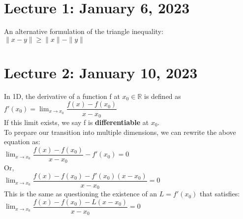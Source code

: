 \documentclass[12pt]{article}
\begin{document}
\section{Lecture 1: January 6, 2023}
\begin{tcolorbox}
An alternative formulation of the triangle inequality:\\
$\|x - y\| \geq \|x\| - \|y \|$
\end{tcolorbox}
\section{Lecture 2: January 10, 2023}
In 1D, the derivative of a function f at $x_0 \in \mathbb{R}$ is defined as \\
$f'(x_0) = \lim_{x\rightarrow x_0} \dfrac{f(x) - f(x_0)}{x - x_0}$\\
If this limit exists, we say f is \textbf{differentiable} at $x_0$.\\
To prepare our transition into multiple dimensions, we can rewrite the above equation as:\\
$\lim_{x \rightarrow x_0} \dfrac{f(x) - f(x_0)}{x - x_0} - f'(x_0) = 0$\\
Or,\\
$\lim_{x \rightarrow x_0} \dfrac{f(x) - f(x_0) - f'(x_0)(x - x_0)}{x - x_0} = 0$\\
This is the same as questioning the existence of an $L = f'(x_0)$ that satisfies:\\
$\lim_{x \rightarrow x_0} \dfrac{f(x) - f(x_0) - L(x - x_0)}{x - x_0} = 0$\\



\begin{comment}
\begin{tcolorbox}
A function $f: \Omega \subseteq \mathbb{R}^n \rightarrow \mathbb{R}^m$ \textbf{is differentiable at $x_0 \in \mathbb{R}^n$} \\
if $\forall \epsilon > 0, \exists \delta > 0$ such that there exists a linear map $L: \mathbb{R}^n \rightarrow \mathbb{R}^m$ such that when $\|h\|_{\mathbb{R}^n} < \delta$, we have $\|f(x_0 + h) - f(x_0) - L \cdot h\|_{\mathbb{R}^m} < \epsilon \|h\|_{\mathbb{R}^n}$.
\end{tcolorbox}
\end{comment}
\end{document}
